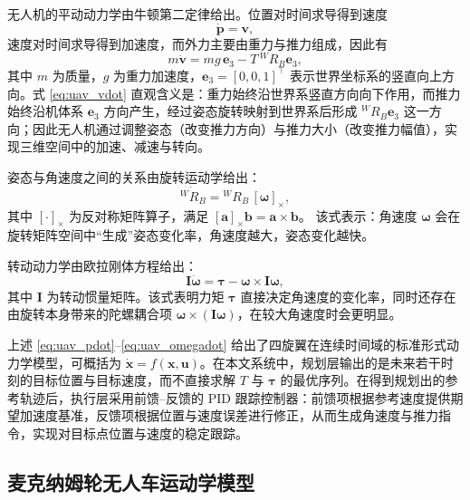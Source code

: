 无人机的平动动力学由牛顿第二定律给出。位置对时间求导得到速度
\begin{equation}
\dot{\mathbf{p}}=\mathbf{v},
\label{eq:uav_pdot}
\end{equation}
速度对时间求导得到加速度，而外力主要由重力与推力组成，因此有
\begin{equation}
m\dot{\mathbf{v}} = m g\,\mathbf{e}_3 - T\,{}^{W}\!R_{B}\mathbf{e}_3,
\label{eq:uav_vdot}
\end{equation}
其中 \(m\) 为质量，\(g\) 为重力加速度，\(\mathbf{e}_3=[0,0,1]^\top\) 表示世界坐标系的竖直向上方向。式 \eqref{eq:uav_vdot} 直观含义是：重力始终沿世界系竖直方向向下作用，而推力始终沿机体系 \(\mathbf{e}_3\) 方向产生，经过姿态旋转映射到世界系后形成 \({}^{W}\!R_{B}\mathbf{e}_3\) 这一方向；因此无人机通过调整姿态（改变推力方向）与推力大小（改变推力幅值），实现三维空间中的加速、减速与转向。

姿态与角速度之间的关系由旋转运动学给出：
\begin{equation}
\dot{{}^{W}\!R_{B}} = {}^{W}\!R_{B}\,[\boldsymbol{\omega}]_\times,
\label{eq:uav_Rdot}
\end{equation}
其中 \([\cdot]_\times\) 为反对称矩阵算子，满足
\([\mathbf{a}]_\times\mathbf{b}=\mathbf{a}\times\mathbf{b}\)。
该式表示：角速度 \(\boldsymbol{\omega}\) 会在旋转矩阵空间中“生成”姿态变化率，角速度越大，姿态变化越快。

转动动力学由欧拉刚体方程给出：
\begin{equation}
\mathbf{I}\dot{\boldsymbol{\omega}} = \boldsymbol{\tau}-\boldsymbol{\omega}\times \mathbf{I}\boldsymbol{\omega},
\label{eq:uav_omegadot}
\end{equation}
其中 \(\mathbf{I}\) 为转动惯量矩阵。该式表明力矩 \(\boldsymbol{\tau}\) 直接决定角速度的变化率，同时还存在由旋转本身带来的陀螺耦合项 \(\boldsymbol{\omega}\times(\mathbf{I}\boldsymbol{\omega})\)，在较大角速度时会更明显。

上述 \eqref{eq:uav_pdot}--\eqref{eq:uav_omegadot} 给出了四旋翼在连续时间域的标准形式动力学模型，可概括为 \(\dot{\mathbf{x}}=f(\mathbf{x},\mathbf{u})\)。在本文系统中，规划层输出的是未来若干时刻的目标位置与目标速度，而不直接求解 \(T\) 与 \(\boldsymbol{\tau}\) 的最优序列。在得到规划出的参考轨迹后，执行层采用前馈--反馈的 PID 跟踪控制器：前馈项根据参考速度提供期望加速度基准，反馈项根据位置与速度误差进行修正，从而生成角速度与推力指令，实现对目标点位置与速度的稳定跟踪。

\subsection{麦克纳姆轮无人车运动学模型}\label{subsec:ugv_mecanum}


